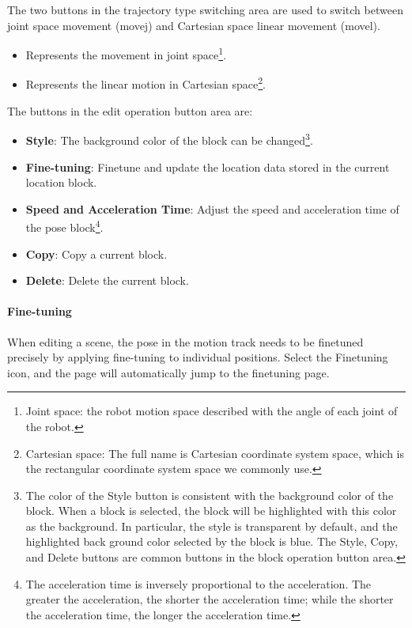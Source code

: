 The two buttons in the trajectory type switching area are used to switch between joint space movement (movej) and Cartesian space linear movement (movel).

\newpage

\begin{itemize}
	\item[\icn{image/ic_joint.pdf}] Represents the movement in joint space\footnote{Joint space: the robot motion space described with the angle of each joint of the robot.}.
	\item[\icn{image/ic_line.pdf}] Represents the linear motion in Cartesian space\footnote{Cartesian space: The full name is Cartesian coordinate system space, which is the rectangular coordinate system space we commonly use.}.
\end{itemize}

The buttons in the edit operation button area are:

\begin{itemize}
\item [\quad] {\sffamily\bfseries Style}: The background color of the block can be changed\footnote{The color of the {Style} button is consistent with the background color of the block. When a block is selected, the block will be highlighted with this color as the background. In particular, the style is transparent by default, and the highlighted back­ ground color selected by the block is blue. The Style, Copy, and Delete buttons are common buttons in the block operation button area.}.
\item [\icn{image/ic_adjust.pdf}] {\sffamily\bfseries Fine-tuning}: Fine­tune and update the location data stored in the current location block.
\newpage
\item [\icn{image/ic_a_v.pdf}] {\sffamily\bfseries Speed and Acceleration Time}: Adjust the speed and acceleration time of the pose block\footnote{The acceleration time is inversely proportional to the acceleration. The greater the acceleration, the shorter the acceleration time; while the shorter the acceleration time, the longer the acceleration time.}.
\item [\icn{image/ic_copy.pdf}] {\sffamily\bfseries Copy}: Copy a current block.
\item [\icn{image/ic_delete.pdf}] {\sffamily\bfseries Delete}: Delete the current block.
\end{itemize}

\paragraph{Fine-tuning}
\label{sec:微调}
When editing a scene, the pose in the motion track needs to be fine­tuned precisely by applying fine-tuning to individual positions. Select the Fine­tuning icon, and the page will automatically jump to the fine­tuning page.


